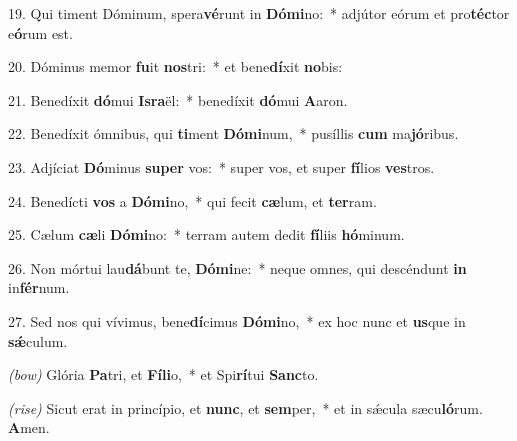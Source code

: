 19. Qui timent Dóminum, spera\textbf{vé}runt in \textbf{Dó}\textbf{mi}no:~* 
	adjútor eórum et pro\textbf{téc}tor e\textbf{ó}rum est.

20. Dóminus memor \textbf{fu}it \textbf{nos}tri:~* 
	et bene\textbf{dí}xit \textbf{no}bis:

21. Benedíxit \textbf{dó}mui \textbf{Is}\textbf{ra}ël:~* 
	benedíxit \textbf{dó}mui \textbf{A}aron.

22. Benedíxit ómnibus, qui \textbf{ti}ment \textbf{Dó}\textbf{mi}num,~* 
	pusíllis \textbf{cum} ma\textbf{jó}ribus.

23. Adjíciat \textbf{Dó}minus \textbf{su}\textbf{per} vos:~* 
	super vos, et super \textbf{fí}lios \textbf{ves}tros.

24. Benedícti \textbf{vos} a \textbf{Dó}\textbf{mi}no,~* 
	qui fecit \textbf{cæ}lum, et \textbf{ter}ram.

25. Cælum \textbf{cæ}li \textbf{Dó}\textbf{mi}no:~* 
	terram autem dedit \textbf{fí}liis \textbf{hó}minum.

26. Non mórtui lau\textbf{dá}bunt te, \textbf{Dó}\textbf{mi}ne:~* 
	neque omnes, qui descéndunt \textbf{in} in\textbf{fér}num.

27. Sed nos qui vívimus, bene\textbf{dí}cimus \textbf{Dó}\textbf{mi}no,~* 
	ex hoc nunc et \textbf{us}que in \textbf{s\'{\ae}}culum.

{\color{red} \textit{(bow)}} Glória \textbf{Pa}tri, et \textbf{Fí}\textbf{li}o,~* 
	et Spi\textbf{rí}tui \textbf{Sanc}to.

{\color{red} \textit{(rise)}} Sicut erat in princípio, et \textbf{nunc}, et \textbf{sem}per,~* 
	et in s\'{\ae}cula sæcu\textbf{ló}rum. \textbf{A}men.
